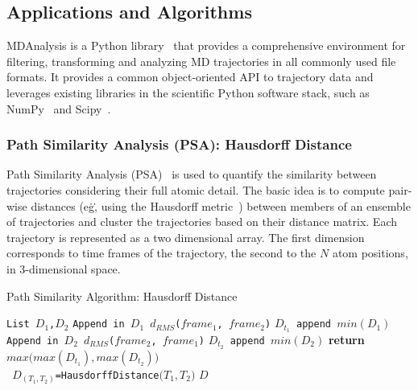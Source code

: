 \subsection{Applications and Algorithms}
\label{ssec:mda}
MDAnalysis is a Python library~\cite{michaud2011mdanalysis,gowers2016mdanalysis} that provides a comprehensive environment for filtering, transforming and analyzing MD trajectories in all commonly used file formats.
It provides a common object-oriented API to trajectory data and leverages existing libraries in the scientific Python software stack, such as NumPy~\cite{numpy} and Scipy~\cite{scipy}.

\subsubsection*{Path Similarity Analysis (PSA): Hausdorff Distance}Path Similarity Analysis (PSA)~\cite{seyler2015path} is used to quantify the similarity between trajectories considering their full atomic detail.
The basic idea is to compute pair-wise distances (e\.g\., using the Hausdorff metric~\cite{huttenlocher1993comparing}) between members of an ensemble of trajectories and cluster the trajectories based on their distance matrix.
Each trajectory is represented as a two dimensional array.
The first dimension corresponds to time frames of the trajectory, the second to the $N$ atom positions, in 3-dimensional space.

\begin{algorithm}[t]
    \scriptsize
    \caption{Path Similarity Algorithm: Hausdorff Distance}
    \label{alg:hausdorff}
    \begin{algorithmic}[1]
        \State \texttt{List $D_1$,$D_2$}
        \State \texttt{Append in $D_1$ $d_{RMS}$($frame_1$, $frame_2$)}
        \EndFor
        \State \texttt{$D_{t_1}$ append $min(D_1)$}
        \EndFor
        \State \texttt{Append in $D_2$ $d_{RMS}$($frame_2$, $frame_1$)}
        \EndFor
        \State\texttt{$D_{t_2}$ append $min(D_2)$}
        \EndFor
        \State \textbf{return} $max\Big(max(D_{t_1}),max(D_{t_2})\Big)$
        \EndProcedure
        \\        
        \State \texttt{ $D_{( T_1,T_2 )}$=HausdorffDistance$\Big( T_1,T_2 \Big)$} 
        \EndFor
        \EndFor
        \State \Return $D$
        \EndProcedure
    \end{algorithmic}
\end{algorithm}

